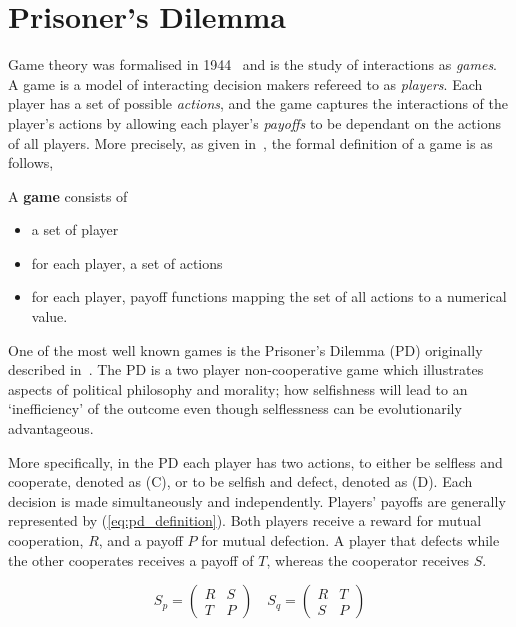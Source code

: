 \section{Prisoner's Dilemma}\label{section:introduction_prisoners_dilemma}

Game theory was formalised in 1944~\cite{VonNeumann1944} and is the study of
interactions as \textit{games}. A game is a model of interacting
decision makers refereed to as \textit{players}. Each player has a set of
possible \textit{actions}, and the game captures the interactions of the player's
actions by allowing each player's \textit{payoffs} to be dependant on the actions
of all players. More precisely, as given in~\cite{Osborne2004}, the formal
definition of a game is as follows,

\begin{definition}
A \textbf{game} consists of
\begin{itemize}
    \item a set of player
    \item for each player, a set of actions
    \item for each player, payoff functions mapping the set of all actions to a numerical value.
\end{itemize}
\end{definition}

One of the most well known games is the Prisoner's Dilemma (PD) originally
described in~\cite{Flood1958}. The PD is a two player non-cooperative game which
illustrates aspects of political philosophy and morality; how selfishness will
lead to an `inefficiency' of the outcome even though selflessness can be
evolutionarily advantageous.

More specifically, in the PD each player has two actions, to either be selfless
and cooperate, denoted as (C), or to be selfish and defect, denoted as (D). Each
decision is made simultaneously and independently. Players' payoffs are
generally represented by (\ref{eq:pd_definition}). Both players receive a reward
for mutual cooperation, \(R\), and a payoff \(P\) for mutual defection. A player
that defects while the other cooperates receives a payoff of \(T\), whereas the
cooperator receives \(S\).

\begin{equation}\label{eq:pd_definition}
    S_p =
    \begin{pmatrix}
        R & S  \\
        T & P
    \end{pmatrix}
    \quad
    S_q =
    \begin{pmatrix}
        R & T  \\
        S & P
    \end{pmatrix}
\end{equation}

